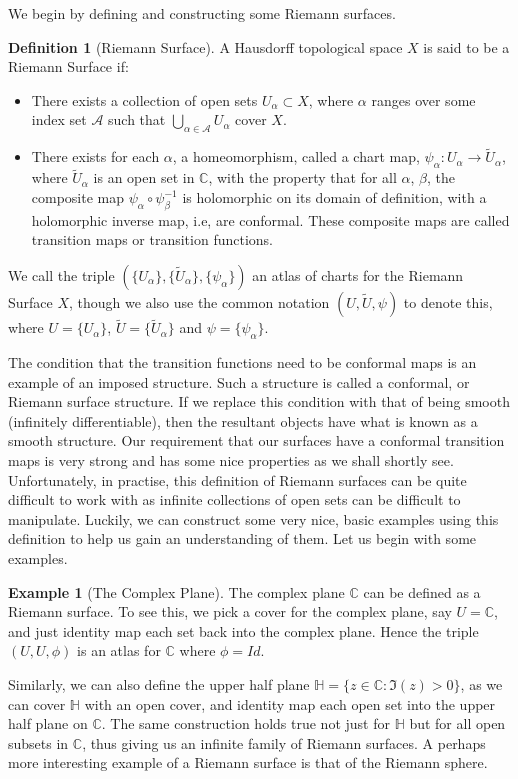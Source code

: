 \documentclass[11pt]{report}
\theoremstyle{definition}
\newtheorem{defn}[thm]{Definition}
\newtheorem*{example*}{Example}
\begin{document}
We begin by defining and constructing some Riemann surfaces.

\begin{defn}[Riemann Surface]\label{rsdefn}
A Hausdorff topological space $X$ is said to be a Riemann Surface if:
\begin{itemize}
\item There exists a collection of open sets $U_{\alpha} \subset X$, where
  $\alpha$ ranges over some index set $\mathcal{A}$ such that $\bigcup\limits_{\alpha \in \mathcal{A}} 
  U_{\alpha}$ cover $X$.
\item There exists for each $\alpha$, a homeomorphism, called a chart map,
  $ \psi_{\alpha}\colon U_{\alpha} \rightarrow \tilde{U}_{\alpha}$, where $\tilde{U}_{\alpha}$ is 
  an open set in $\mathbb{C}$, with the property that for all $\alpha$,
  $\beta$, the composite map $\psi_{\alpha} \circ \psi_{\beta}^{-1}$ is
  holomorphic on its domain of definition, with a holomorphic inverse map, i.e, are conformal. These composite maps are called transition maps or transition functions.
\end{itemize}
We call the triple $(\{U_\alpha\},\{\tilde{U}_{\alpha}\},
\{\psi_\alpha\})$ an atlas of charts for the Riemann Surface $X$, though we also use the common
notation $(U,\tilde{U}, \psi)$ to denote this, where $U=\{U_\alpha\}$, $\tilde{U}=\{\tilde{U} _{\alpha}\}$ and $\psi=\{\psi_\alpha\}$.
\end{defn}
The condition that the transition functions need to be conformal maps is an example of an imposed structure. Such a structure is called a conformal, or Riemann surface structure. If we replace this condition with that of being smooth (infinitely differentiable), then the resultant objects have what is known as a smooth structure. Our requirement that our surfaces have a conformal transition maps is very strong and has some nice properties as we shall shortly see. Unfortunately, in practise, this definition of Riemann surfaces can be quite difficult to work with as infinite collections of open sets can be difficult to manipulate. Luckily, we can construct some very nice, basic examples using this definition to help us gain an understanding of them. Let us begin with some examples.
\begin{example*}[The Complex Plane]
  The complex plane $\mathbb{C}$ can be defined as a Riemann surface. To see this, we pick a cover for the complex plane, say $U = \mathbb{C}$, and just identity map each set back into the complex plane. Hence the triple $(U,U,\phi)$ is an atlas for $\mathbb{C}$ where $\phi=Id$.
\end{example*}
Similarly, we can also define the upper half plane $\mathbb{H}=\{ z \in \mathbb{C} \colon \Im(z)>0\}$, as we can cover $\mathbb{H}$ with an open cover, and identity map each open set into the upper half plane on $\mathbb{C}$. The same construction holds true not just for $\mathbb{H}$ but for all open subsets in $\mathbb{C}$, thus giving us an infinite family of Riemann surfaces. A perhaps more interesting example of a Riemann surface is that of the Riemann sphere.
\end{document}
